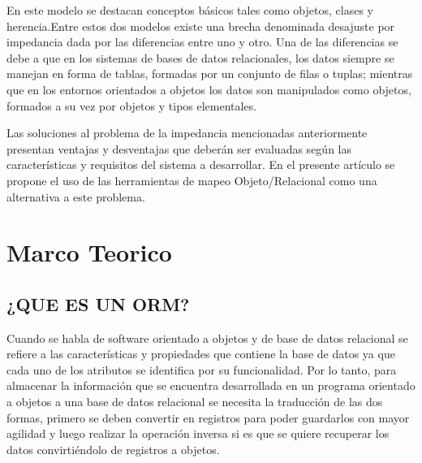 \documentclass[preprint,12pt]{elsarticle}
\begin{document}
En  este  modelo  se  destacan  conceptos  básicos  tales  como  objetos,  clases  y herencia.Entre  estos  dos  modelos  existe  una  brecha  denominada  desajuste  por  impedancia  dada  por  las diferencias  entre  uno  y  otro.  Una  de  las  diferencias  se  debe  a  que  en  los  sistemas  de  bases  de  datos relacionales,  los  datos  siempre  se  manejan  en  forma  de  tablas,  formadas  por  un  conjunto  de  filas  o tuplas;  mientras  que  en  los  entornos  orientados  a  objetos  los  datos  son  manipulados  como  objetos, formados a su vez por objetos y tipos elementales.

Las   soluciones   al   problema   de   la   impedancia   mencionadas   anteriormente   presentan   ventajas   y desventajas que deberán ser evaluadas según las características y requisitos del sistema a desarrollar. En el  presente  artículo  se  propone  el  uso  de  las  herramientas  de  mapeo  Objeto/Relacional  como  una alternativa a este problema.

\section{Marco Teorico}
	
\subsection{¿QUE ES UN ORM?}	

Cuando se habla de software orientado a objetos y de base de datos relacional se refiere a las características y propiedades que contiene la base de datos ya que cada uno de los atributos se 
identifica por su funcionalidad. Por lo tanto, para almacenar la información que se encuentra desarrollada en un programa orientado a objetos a una base de datos relacional se necesita la traducción de las dos formas, primero se deben convertir en registros para poder guardarlos con mayor agilidad y luego realizar la operación inversa si es que se quiere recuperar los datos convirtiéndolo de registros a objetos.\citep {referencia05}
\end{document}
